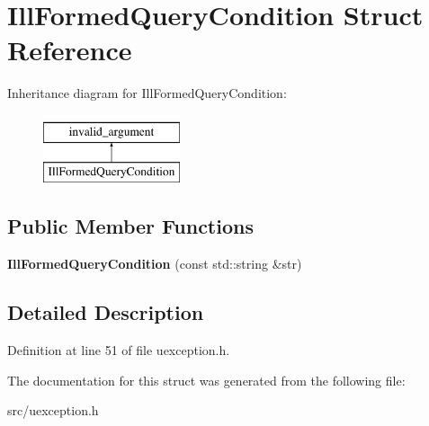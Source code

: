 \hypertarget{struct_ill_formed_query_condition}{}\section{Ill\+Formed\+Query\+Condition Struct Reference}
\label{struct_ill_formed_query_condition}
Inheritance diagram for Ill\+Formed\+Query\+Condition\+:\begin{figure}[H]
\begin{center}
\leavevmode
\includegraphics[height=2.000000cm]{struct_ill_formed_query_condition}
\end{center}
\end{figure}
\subsection*{Public Member Functions}
\begin{DoxyCompactItemize}
\item 
\mbox{\label{struct_ill_formed_query_condition_a05ad150e00ad1cf9f9f33f78c9f1b2f9}} 
{\bfseries Ill\+Formed\+Query\+Condition} (const std\+::string \&str)
\end{DoxyCompactItemize}


\subsection{Detailed Description}


Definition at line 51 of file uexception.\+h.



The documentation for this struct was generated from the following file\+:\begin{DoxyCompactItemize}
\item 
src/uexception.\+h\end{DoxyCompactItemize}
